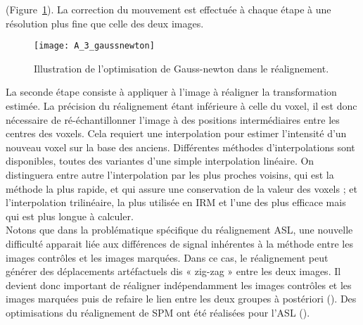 (Figure~\ref{fig:A_3_gaussnewton}). La correction du mouvement est effectuée à chaque étape à une résolution plus fine que
celle des deux images. \\
\begin{figure}[!t]
\centering
\texttt{[image: A\_3\_gaussnewton]}
\caption{Illustration de l’optimisation de Gauss-newton dans le réalignement.}
\label{fig:A_3_gaussnewton}	
\end{figure}
La seconde étape consiste à appliquer à l’image à réaligner la transformation estimée. La
précision du réalignement étant inférieure à celle du voxel, il est donc nécessaire de ré-échantillonner
l’image à des positions intermédiaires entre les centres des voxels. Cela requiert une interpolation
pour estimer l’intensité d’un nouveau voxel sur la base des anciens. Différentes méthodes
d’interpolations sont disponibles, toutes des variantes d’une simple interpolation linéaire. On
distinguera entre autre l’interpolation par les plus proches voisins, qui est la méthode la plus rapide,
et qui assure une conservation de la valeur des voxels ; et l’interpolation trilinéaire, la plus utilisée en
IRM et l’une des plus efficace mais qui est plus longue à calculer.\\
Notons que dans la problématique spécifique du réalignement ASL, une nouvelle difficulté
apparait liée aux différences de signal inhérentes à la méthode entre les images contrôles et les images
marquées. Dans ce cas, le réalignement peut générer des déplacements artéfactuels dis « zig-zag »
entre les deux images. Il devient donc important de réaligner indépendamment les images contrôles
et les images marquées puis de refaire le lien entre les deux groupes à postériori (\cite{Wang2008}). Des
optimisations du réalignement de SPM ont été réalisées pour l’ASL (\cite{Wang2012}).\\
